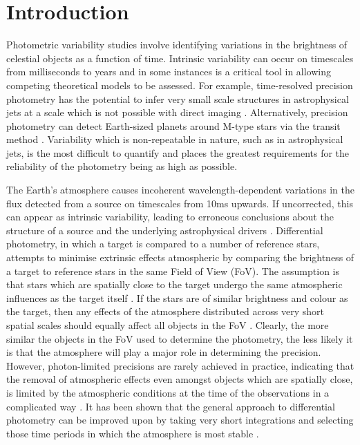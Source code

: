 \documentclass{aa}
\begin{document}
\maketitle

\section{Introduction}
\label{introduction}

Photometric variability studies involve identifying variations in the brightness of celestial objects as a function of time. Intrinsic variability can occur on timescales from milliseconds to years and in some instances is a critical tool in allowing competing theoretical models to be assessed. For example, time-resolved precision photometry has the potential to infer very small scale structures in astrophysical jets at a scale which is not possible with direct imaging \citep{smith2008emccd}. Alternatively, precision photometry can detect Earth-sized planets around M-type stars via the transit method \citep{giltinan2011using,everett2001technique}.  Variability which is non-repeatable in nature, such as in astrophysical jets, is the most difficult to quantify and places the greatest requirements for the reliability of the photometry being as high as possible. 

The Earth's atmosphere causes incoherent wavelength-dependent variations in the flux detected from a source on timescales from 10ms upwards. If uncorrected, this can appear as intrinsic variability, leading to erroneous conclusions about the structure of a source and the underlying astrophysical drivers \citep{smith2008emccd}. Differential photometry, in which a target is compared to a number of reference stars, attempts to minimise extrinsic effects atmospheric by comparing the brightness of a target to reference stars in the same Field of View (FoV). The assumption is that stars which are spatially close to the target undergo the same atmospheric influences as the target itself \citep{burdanov2014astrokit}. If the stars are of similar brightness and colour as the target, then any effects of the atmosphere distributed across very short spatial scales should equally affect all objects in the FoV \citep{young1991precise,howell2006handbook}. Clearly, the more similar the objects in the FoV used to determine the photometry, the less likely it is that the atmosphere will play a major role in determining the precision. However, photon-limited precisions are rarely achieved in practice, indicating that the removal of atmospheric effects even amongst objects which are spatially close, is limited by the atmospheric conditions at the time of the observations in a complicated way \citep{everett2001technique,howell2002some}.   It has been shown that the general approach to differential photometry can be improved upon by taking very short integrations and selecting those time periods in which the atmosphere is most stable \citep{giltinan2011using}.
\end{document}
